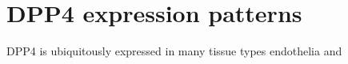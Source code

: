 \section{DPP4 expression patterns}
DPP4 is ubiquitously expressed in many tissue types endothelia and 
